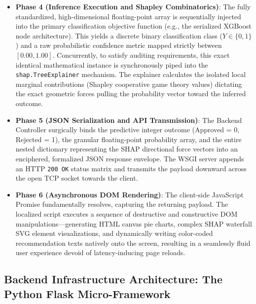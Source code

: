 \begin{itemize}
  instances \(x_i\) are mathematically standardized into Z-scores mapped
  explicitly against the globally frozen \(\mu\) and \(\sigma\) tensors
  formulated strictly from the historic dataset.
\item
  \textbf{Phase 4 (Inference Execution and Shapley Combinatorics)}: The
  fully standardized, high-dimensional floating-point array is
  sequentially injected into the primary classification objective
  function (e.g., the serialized XGBoost node architecture). This yields
  a discrete binary classification class (\(Y \in \{0, 1\}\)) and a raw
  probabilistic confidence metric mapped strictly between
  \([0.00, 1.00]\). Concurrently, to satisfy auditing requirements, this
  exact identical mathematical instance is synchronously piped into the
  \texttt{shap.TreeExplainer} mechanism. The explainer calculates the
  isolated local marginal contributions (Shapley cooperative game theory
  values) dictating the exact geometric forces pulling the probability
  vector toward the inferred outcome.
\item
  \textbf{Phase 5 (JSON Serialization and API Transmission)}: The
  Backend Controller surgically binds the predictive integer outcome
  (Approved = 0, Rejected = 1), the granular floating-point probability
  array, and the entire nested dictionary representing the SHAP
  directional force vectors into an enciphered, formalized JSON response
  envelope. The WSGI server appends an HTTP \texttt{200\ OK} status
  matrix and transmits the payload downward across the open TCP socket
  towards the client.
\item
  \textbf{Phase 6 (Asynchronous DOM Rendering)}: The client-side
  JavaScript Promise fundamentally resolves, capturing the returning
  payload. The localized script executes a sequence of destructive and
  constructive DOM manipulations---generating HTML canvas pie charts,
  complex SHAP waterfall SVG element visualizations, and dynamically
  writing color-coded recommendation texts natively onto the screen,
  resulting in a seamlessly fluid user experience devoid of
  latency-inducing page reloads.
\end{itemize}

\hypertarget{backend-infrastructure-architecture-the-python-flask-micro-framework}{%
\subsection{Backend Infrastructure Architecture: The Python Flask
Micro-Framework}\label{backend-infrastructure-architecture-the-python-flask-micro-framework}}

